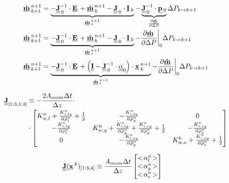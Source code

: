 \begin{align}
\vec{\dot{m}}^{n+1}_{k+1} & =
\underbrace{-\mat{J}_{\,0}^{-1}\cdot \vec{E} + \vec{\dot{m}}^{n+1}_{k} - \mat{J}_{\,0}\cdot \vec{I}_{k}}_{\vec{\dot{m}}^{n+1}_{*}} - \underbrace{\mat{J}_{\,0}^{-1} \cdot \vec{p}_{0}}_{\frac{\partial \vec{\dot{m}}}{\partial \Delta P}} \Delta P_{k \rightarrow k+1} \\
\vec{\dot{m}}^{n+1}_{k+1} & =
\underbrace{-\mat{J}_{\,0}^{-1}\cdot \vec{E} + \vec{\dot{m}}^{n+1}_{k} - \mat{J}_{\,0}\cdot \vec{I}_{k}}_{\vec{\dot{m}}^{n+1}_{*}} - \frac{\partial \vec{\dot{m}}}{\partial \Delta P}\bigg|_{0} \Delta P_{k \rightarrow k+1} \\
\vec{\dot{m}}^{n+1}_{k+1} & =
\underbrace{-\mat{J}_{\,0}^{-1}\cdot \vec{E} + \left(\mat{I} - \mat{J}^{-1}_{\,0}\cdot \mat{\alpha}_{0}\right)\cdot\vec{x}^{n+1}_{k}}_{\vec{\dot{m}}^{n+1}_{*}} - \frac{\partial \vec{\dot{m}}}{\partial \Delta P}\bigg|_{0} \Delta P_{k \rightarrow k+1}
\end{align}


\begin{align}
\Mat{J}_{[1:3,1:3]} & \equiv -\frac{2 A_{mom}\Delta t}{\Delta z}\cdot \nonumber \\
&\cdot \begin{bmatrix} 
K^{n}_{w,l} + \frac{K^{n}_{i,lg}}{\Ave{\alpha\rho}^{n}_{l}} +\frac{1}{2} &  -\frac{K^{n}_{i,lg}}{\Ave{\alpha\rho}^{n}_{g}} & 0\\
-\frac{K^{n}_{i,lg}}{\Ave{\alpha\rho}^{n}_{l}} &  K^{n}_{w,g} + \frac{K^{n}_{i,lg}}{\Ave{\alpha\rho}^{n}_{g}}+\frac{K^{n}_{i,eg}}{\Ave{\alpha\rho}^{n}_{g}} +\frac{1}{2} & -\frac{K^{n}_{i,eg}}{\Ave{\alpha\rho}^{n}_{e}}\\
0 & -\frac{K^{n}_{i,eg}}{\Ave{\alpha\rho}^{n}_{g}} &  K^{k}_{w,e} + \frac{K^{n}_{i,eg}}{\Ave{\alpha\rho}^{n}_{e}}+\frac{1}{2}\\
\end{bmatrix}
\end{align}

\begin{align}
\Mat{J}(\Vec{x}^{k})_{[1:3,4]} & \equiv \frac{A_{mom}\Delta t}{\Delta z} \begin{bmatrix} 
\Ens{\alpha^{n}_{l}}\\
\Ens{\alpha^{n}_{g}}\\
\Ens{\alpha^{n}_{e}}
\end{bmatrix}
\end{align}




